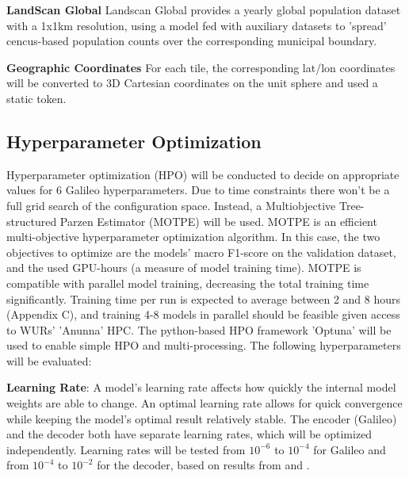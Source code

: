 \documentclass[a4paper,12pt]{article}
\begin{document}
\textbf{LandScan Global} Landscan Global \citep{lebakulaLandScanGlobal302025} provides a yearly global population dataset with a 1x1km resolution, using a model fed with auxiliary datasets to 'spread' cencus-based population counts over the corresponding municipal boundary.

\textbf{Geographic Coordinates} For each tile, the corresponding lat/lon coordinates will be converted to 3D Cartesian coordinates on the unit sphere and used a static token.

\subsection{Hyperparameter Optimization}
Hyperparameter optimization (HPO) will be conducted to decide on appropriate values for 6 Galileo hyperparameters. Due to time constraints there won't be a full grid search of the configuration space. Instead, a Multiobjective Tree-structured Parzen Estimator (MOTPE) \citep{bergstraAlgorithmsHyperParameterOptimization2011} will be used. MOTPE is an efficient multi-objective hyperparameter optimization algorithm. In this case, the two objectives to optimize are the models' macro F1-score on the validation dataset, and the used GPU-hours (a measure of model training time). MOTPE is compatible with parallel model training, decreasing the total training time significantly. Training time per run is expected to average between 2 and 8 hours (Appendix C), and training 4-8 models in parallel should be feasible given access to WURs' 'Anunna' HPC. The python-based HPO framework 'Optuna' \citep{akibaOptunaNextgenerationHyperparameter2019} will be used to enable simple HPO and multi-processing. The following hyperparameters will be evaluated:

\textbf{Learning Rate}: A model's learning rate affects how quickly the internal model weights are able to change. An optimal learning rate allows for quick convergence while keeping the model's optimal result relatively stable. The encoder (Galileo) and the decoder both have separate learning rates, which will be optimized independently. Learning rates will be tested from \(10^{-6}\) to \(10^{-4}\) for Galileo and from \(10^{-4}\) to \(10^{-2}\) for the decoder, based on results from \citet{tsengGalileoLearningGlobal2025} and \citet{castiglioniShapingFineTuningGeospatial2025}.
\end{document}
